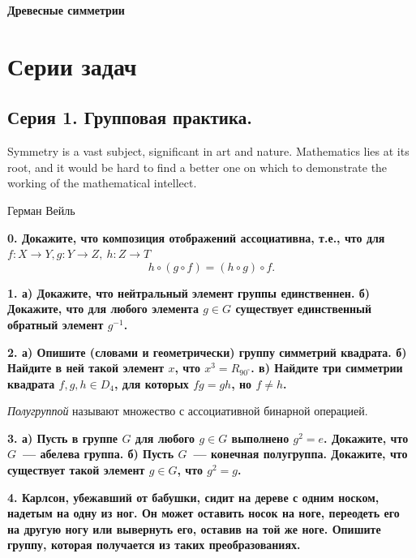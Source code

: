 \documentclass[12pt, oneside, dvipsnames]{extarticle}
\begin{document}
	
	\begin{center}
	{ \Huge \bf{Древесные симметрии} }

	\section*{Серии задач}
	\end{center}

	\tableofcontents

	\begin{center}
	\subsection*{Серия 1. Групповая практика. }
	\end{center}


	\epigraph{Symmetry is a vast subject, significant in art and nature. Mathematics lies at its root, and it would be hard to find a better one on which to demonstrate the working of the mathematical intellect.}{Герман Вейль}

	\bf{0.} Докажите, что композиция отображений ассоциативна, т.е., что для $f \colon X \to Y, g \colon Y \to Z, \ h \colon Z \to T$
	\[
		h \circ (g \circ f) = (h \circ g) \circ f.
	\]

	\bf{1.} а) Докажите, что нейтральный элемент группы единственнен. б) Докажите, что для любого элемента $g \in G$ существует единственный обратный элемент $g^{-1}$. 

	\bf{2.} а) Опишите (словами и геометрически) группу симметрий квадрата. б) Найдите в ней такой элемент $x$, что $x^3 = R_{90^{\circ}}$. в) Найдите три симметрии квадрата $f, g, h \in D_{4}$, для которых $fg = gh$, но $f \neq h$.

	\begin{definition} 
		\emph{Полугруппой} называют множество с ассоциативной бинарной операцией. 
	\end{definition}

	\bf{3.} а)  Пусть в группе $G$ для любого $g \in G$ выполнено $g^2 = e$. Докажите, что $G$~--- абелева группа.  б) Пусть $G$~--- конечная полугруппа. Докажите, что существует такой элемент $g \in G$, что $g^2 = g$.

	\bf{4.} Карлсон, убежавший от бабушки, сидит на дереве с одним носком, надетым на одну из ног. Он может оставить носок на ноге, переодеть его на другую ногу или вывернуть его, оставив на той же ноге. Опишите группу, которая получается из таких преобразованиях. 
\end{document}
